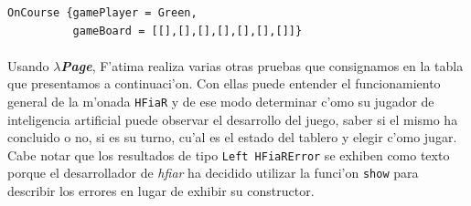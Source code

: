 \documentclass[a4paper]{article}
\newcommand{\hpage}{\textbf{\textsl{$\lambda$Page}}}
\begin{document}
\begin{center}\begin{lstlisting}
OnCourse {gamePlayer = Green,
          gameBoard = [[],[],[],[],[],[],[]]}
\end{lstlisting}\end{center}
\newpage
\paragraph{}Usando \hpage, F'atima realiza varias otras pruebas que consignamos en la tabla que presentamos a continuaci'on.  Con ellas puede entender el funcionamiento general de la m'onada \texttt{HFiaR} y de ese modo determinar c'omo su jugador de inteligencia artificial puede observar el desarrollo del juego, saber si el mismo ha concluido o no, si es su turno, cu'al es el estado del tablero y elegir c'omo jugar.  Cabe notar que los resultados de tipo \texttt{Left HFiaRError} se exhiben como texto porque el desarrollador de \textsl{hfiar} ha decidido utilizar la funci'on \texttt{show} para describir los errores en lugar de exhibir su constructor.
\end{document}
